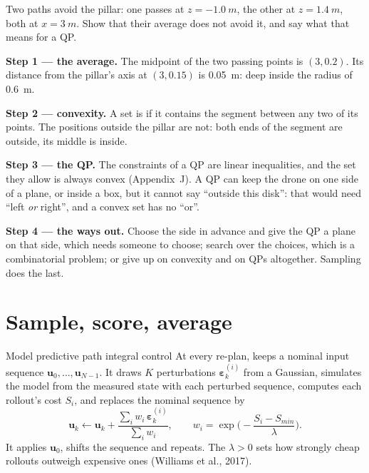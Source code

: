 \begin{example}
\label{ex:mppi-convex}
Two paths avoid the pillar: one passes at $z = \SI{-1.0}{m}$, the other at $z = \SI{+1.4}{m}$, both at $x = \SI{3}{m}$. Show that their average does not avoid it, and say what that means for a QP.

\textbf{Step 1 — the average.} The midpoint of the two passing points is $(3, 0.2)$. Its distance from the pillar's axis at $(3, 0.15)$ is \SI{0.05}{m}: deep inside the radius of \SI{0.6}{m}.

\textbf{Step 2 — convexity.} A set is  if it contains the segment between any two of its points. The positions outside the pillar are not: both ends of the segment are outside, its middle is inside.

\textbf{Step 3 — the QP.} The constraints of a QP are linear inequalities, and the set they allow is always convex (Appendix~J). A QP can keep the drone on one side of a plane, or inside a box, but it cannot say \enquote{outside this disk}: that would need \enquote{left \emph{or} right}, and a convex set has no \enquote{or}.

\textbf{Step 4 — the ways out.} Choose the side in advance and give the QP a plane on that side, which needs someone to choose; search over the choices, which is a combinatorial problem; or give up on convexity and on QPs altogether. Sampling does the last.
\end{example}

\section{Sample, score, average}

\begin{definition}{Model predictive path integral control}
At every re-plan,  keeps a nominal input sequence $\symbf u_0, \dots, \symbf u_{N-1}$. It draws $K$ perturbations $\boldsymbol\varepsilon^{(i)}_k$ from a Gaussian, simulates the model from the measured state with each perturbed sequence, computes each rollout's cost $S_i$, and replaces the nominal sequence by
\begin{equation}\label{eq:mppi-update}
  \symbf u_k \leftarrow \symbf u_k + \frac{\sum_i w_i\,\boldsymbol\varepsilon^{(i)}_k}{\sum_i w_i}, \qquad w_i = \exp\!\Big(-\frac{S_i - S_{min}}{\lambda}\Big).
\end{equation}
It applies $\symbf u_0$, shifts the sequence and repeats. The  $\lambda > 0$ sets how strongly cheap rollouts outweigh expensive ones (Williams et al., 2017).
\end{definition}

